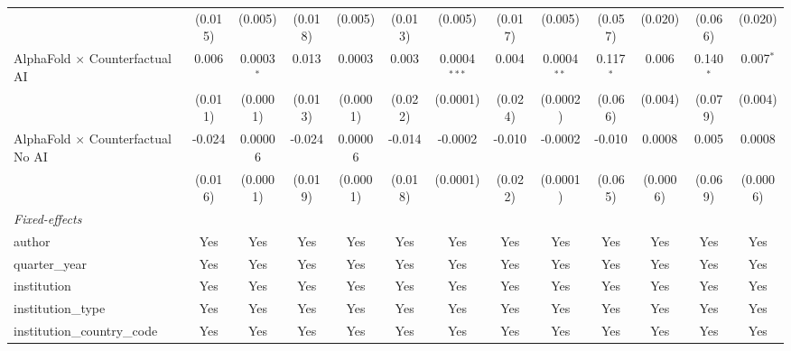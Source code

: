 \begin{tabular}{lcccccccccccc}
                                            & (0.015)      & (0.005)      & (0.018)      & (0.005)  & (0.013)      & (0.005)        & (0.017)      & (0.005)       & (0.057)       & (0.020)      & (0.066)       & (0.020)\\   
   AlphaFold $\times$ Counterfactual AI     & 0.006        & 0.0003$^{*}$ & 0.013        & 0.0003   & 0.003        & 0.0004$^{***}$ & 0.004        & 0.0004$^{**}$ & 0.117$^{*}$   & 0.006        & 0.140$^{*}$   & 0.007$^{*}$\\   
                                            & (0.011)      & (0.0001)     & (0.013)      & (0.0001) & (0.022)      & (0.0001)       & (0.024)      & (0.0002)      & (0.066)       & (0.004)      & (0.079)       & (0.004)\\   
   AlphaFold $\times$ Counterfactual No AI  & -0.024       & 0.00006      & -0.024       & 0.00006  & -0.014       & -0.0002        & -0.010       & -0.0002       & -0.010        & 0.0008       & 0.005         & 0.0008\\   
                                            & (0.016)      & (0.0001)     & (0.019)      & (0.0001) & (0.018)      & (0.0001)       & (0.022)      & (0.0001)      & (0.065)       & (0.0006)     & (0.069)       & (0.0006)\\   
   \midrule
   \emph{Fixed-effects}\\
   author                                   & Yes          & Yes          & Yes          & Yes      & Yes          & Yes            & Yes          & Yes           & Yes           & Yes          & Yes           & Yes\\  
   quarter\_year                            & Yes          & Yes          & Yes          & Yes      & Yes          & Yes            & Yes          & Yes           & Yes           & Yes          & Yes           & Yes\\  
   institution                              & Yes          & Yes          & Yes          & Yes      & Yes          & Yes            & Yes          & Yes           & Yes           & Yes          & Yes           & Yes\\  
   institution\_type                        & Yes          & Yes          & Yes          & Yes      & Yes          & Yes            & Yes          & Yes           & Yes           & Yes          & Yes           & Yes\\  
   institution\_country\_code               & Yes          & Yes          & Yes          & Yes      & Yes          & Yes            & Yes          & Yes           & Yes           & Yes          & Yes           & Yes\\  

\end{tabular}
